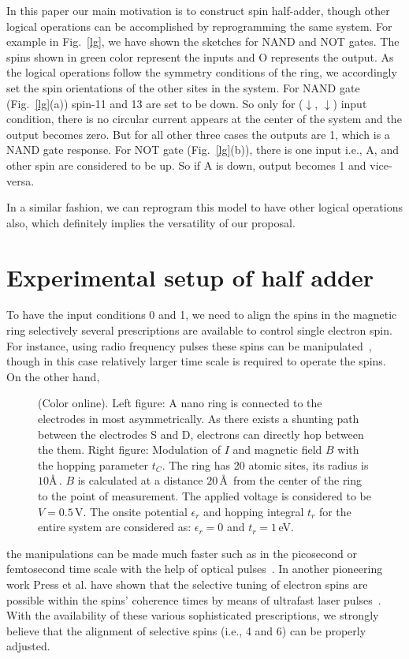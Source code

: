 \documentclass[prb,aps,twocolumn,amsmath,amssymb,floatfix,superscriptaddress]{revtex4}
\begin{document}
In this paper our main motivation is to construct spin half-adder, though
other logical operations can be accomplished by reprogramming the same system. For
example in Fig.~\ref{lg}, we have shown the sketches for NAND and NOT gates. The
spins shown in green color represent the inputs and O represents the output. As the
logical operations follow the symmetry conditions of the ring, we accordingly
set the spin orientations of the other sites in the system. For NAND gate (Fig.~\ref{lg}(a))
spin-11 and 13 are set to be down. So only for ($\downarrow$, $\downarrow$) input condition,
there is no circular current appears at the center of the system and the output becomes
zero. But for all other three cases the outputs are 1, which is a NAND gate response.
For NOT gate (Fig.~\ref{lg}(b)), there is one input i.e., A, and other spin are considered
to be up. So if A is down, output becomes 1 and vice-versa.

In a similar fashion, we can reprogram this model to have other logical operations
also, which definitely implies the versatility of our proposal.

\section{Experimental setup of half adder}

To have the input conditions 0 and 1, we need to align the
spins in the magnetic ring selectively several prescriptions are available to control single electron spin.
For instance, using radio frequency pulses these spins can be manipulated~\cite{pl22,pl23,pl24},
though in this case relatively larger time scale is required to operate the spins. On the other hand,
\begin{figure}[ht]
{\centering
{}
\par}
\caption{(Color online). Left figure: A nano ring is connected to the electrodes in most
asymmetrically. As there exists a shunting path between the electrodes S and D, electrons
can directly hop between the them. Right figure: Modulation of $I$  and
magnetic field $B$  with the hopping parameter $t_C$. The ring has 20 atomic sites,
its radius is $10$\AA$\,$. $B$ is calculated at a distance $20\,$\AA$\,$ from the
center of the ring to the point of measurement. The applied voltage is
considered to be $V=0.5\,$V. The onsite potential $\epsilon_r$ and hopping integral
$t_r$ for the entire system are considered as: $\epsilon_r=0$ and $t_r=1\,$eV.}
\label{f5}
\end{figure}
the manipulations can be made much faster such as in the picosecond or femtosecond time scale with
the help of optical pulses~\cite{pl25,pl26,pl27}. In another pioneering work Press et al. have shown that
the selective tuning of electron spins are possible within the spins' coherence times by means of
ultrafast laser pulses~\cite{pl28}. With the availability of these various sophisticated prescriptions, we
strongly believe that the alignment of selective spins (i.e., 4 and 6) can be properly adjusted.
\end{document}
